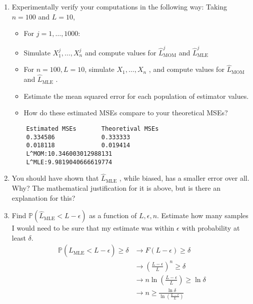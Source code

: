 \documentclass[letter, 12pt]{article}
\begin{document}
\begin{enumerate}[wide = 0pt, label = \arabic*)]
		\item {Experimentally verify your computations in the following way: Taking $ n = 100 $ and $ L = 10 $,}
		\begin{itemize}
			\item {For $ j = 1, \dots , 1000 $:}
			\item {Simulate $ X_1^j , \dots , X_n^j $ and compute values for $ \hat{L}_{\text{MOM}}^j $ and $ \hat{L}_{\text{MLE}}^j $}
			\item {For $ n = 100, L = 10 $, simulate $ X_1 , \dots , X_n $ , and compute values for $ \hat{L}_{\text{MOM}} $ and $ \hat{L}_{\text{MLE}} $ .}
			\item {Estimate the mean squared error for each population of estimator values.}
			\item {How do these estimated MSEs compare to your theoretical MSEs?}
		\end{itemize}
		\begin{lstlisting}
	Estimated MSEs       Theoretival MSEs    
	0.334586             0.333333            
	0.018118             0.019414            
	L^MOM:10.346003012988131
	L^MLE:9.9819040666619774
		\end{lstlisting}
	
		\item {You should have shown that $ \hat{L}_{\text{MLE}} $ , while biased, has a smaller error over all. Why? The mathematical justification for it is above, but is there an explanation for this?}
		
		\item {Find $ \mathbb{P}(\hat{L}_{\text{MLE}} < L - \epsilon) $ as a function of $ L, \epsilon, n $. Estimate how many samples I would need to be sure that my estimate was within $ \epsilon $ with probability at least $ \delta $.}
		\begin{align*}
			\mathbb{P}(\hat{L}_{\text{MLE}} < L - \epsilon) \ge \delta &\rightarrow F(L - \epsilon) \ge \delta \\
			&\rightarrow (\frac{L - \epsilon}{L})^n \ge \delta \\
			&\rightarrow n \ln(\frac{L - \epsilon}{L}) \ge \ln\delta \\
			&\rightarrow n \ge \frac{\ln\delta}{\ln(\frac{L - \epsilon}{L})}
		\end{align*}
		

\end{enumerate}
\end{document}
